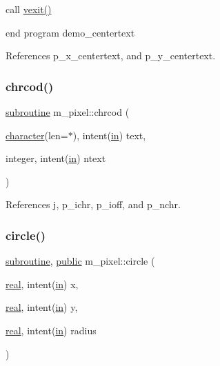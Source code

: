 call \hyperlink{namespacem__pixel_a19ad6b65752322b0029a62cc0ebec3e8}{vexit()}

end program demo\+\_\+centertext 

References p\+\_\+x\+\_\+centertext, and p\+\_\+y\+\_\+centertext.

\mbox{\label{namespacem__pixel_ab25c6cce708ff91a79bbabb23d591a8b}} 
\subsubsection{\texorpdfstring{chrcod()}{chrcod()}}
{\footnotesize\ttfamily \hyperlink{M__stopwatch_83_8txt_acfbcff50169d691ff02d4a123ed70482}{subroutine} m\+\_\+pixel\+::chrcod (\begin{DoxyParamCaption}\item[{\hyperlink{option__stopwatch_83_8txt_abd4b21fbbd175834027b5224bfe97e66}{character}(len=$\ast$), intent(\hyperlink{M__journal_83_8txt_afce72651d1eed785a2132bee863b2f38}{in})}]{text,  }\item[{integer, intent(\hyperlink{M__journal_83_8txt_afce72651d1eed785a2132bee863b2f38}{in})}]{ntext }\end{DoxyParamCaption})\hspace{0.3cm}{\ttfamily [private]}}



References j, p\+\_\+ichr, p\+\_\+ioff, and p\+\_\+nchr.

\mbox{\label{namespacem__pixel_ab3b12cc498ed490014aa5fcc0bb278d2}} 
\subsubsection{\texorpdfstring{circle()}{circle()}}
{\footnotesize\ttfamily \hyperlink{M__stopwatch_83_8txt_acfbcff50169d691ff02d4a123ed70482}{subroutine}, \hyperlink{M__stopwatch_83_8txt_a2f74811300c361e53b430611a7d1769f}{public} m\+\_\+pixel\+::circle (\begin{DoxyParamCaption}\item[{\hyperlink{read__watch_83_8txt_abdb62bde002f38ef75f810d3a905a823}{real}, intent(\hyperlink{M__journal_83_8txt_afce72651d1eed785a2132bee863b2f38}{in})}]{x,  }\item[{\hyperlink{read__watch_83_8txt_abdb62bde002f38ef75f810d3a905a823}{real}, intent(\hyperlink{M__journal_83_8txt_afce72651d1eed785a2132bee863b2f38}{in})}]{y,  }\item[{\hyperlink{read__watch_83_8txt_abdb62bde002f38ef75f810d3a905a823}{real}, intent(\hyperlink{M__journal_83_8txt_afce72651d1eed785a2132bee863b2f38}{in})}]{radius }\end{DoxyParamCaption})}



